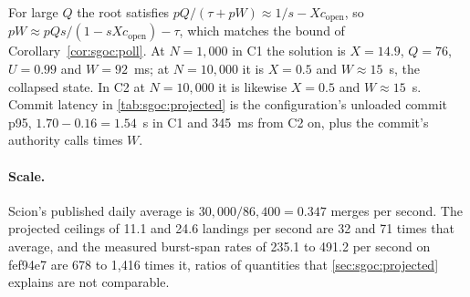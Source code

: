 \documentclass[11pt,letterpaper]{article}
\theoremstyle{definition}
\theoremstyle{remark}
\begin{document}
For large $Q$ the root satisfies $pQ/(\tau + pW) \approx 1/s - X c_{\mathrm{open}}$, so $pW \approx pQs/(1 - sXc_{\mathrm{open}}) - \tau$, which matches the bound of Corollary~\ref{cor:sgoc:poll}. At $N = 1{,}000$ in C1 the solution is $X = 14.9$, $Q = 76$, $U = 0.99$ and $W = 92$~ms; at $N = 10{,}000$ it is $X = 0.5$ and $W \approx 15$~s, the collapsed state. In C2 at $N = 10{,}000$ it is likewise $X = 0.5$ and $W \approx 15$~s. Commit latency in \cref{tab:sgoc:projected} is the configuration's unloaded commit p95, $1.70 - 0.16 = 1.54$~s in C1 and 345~ms from C2 on, plus the commit's authority calls times $W$. %

\paragraph{Scale.} Scion's published daily average is $30{,}000/86{,}400 = 0.347$ merges per second. %
The projected ceilings of 11.1 and 24.6 landings per second are 32 and 71 times that average, and the measured burst-span rates of 235.1 to 491.2 per second on fef94e7 are 678 to 1,416 times it, ratios of quantities that \cref{sec:sgoc:projected} explains are not comparable. %
\end{document}

